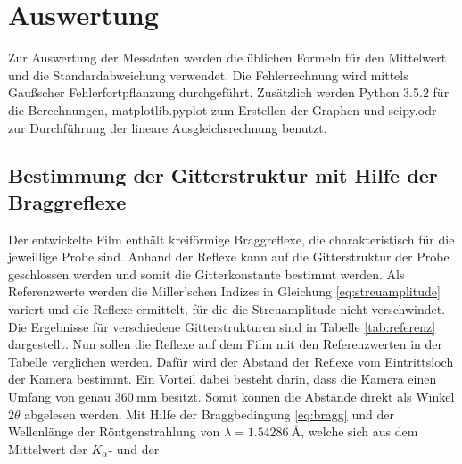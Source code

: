 \section{Auswertung}

Zur Auswertung der Messdaten werden die üblichen Formeln für den Mittelwert und die Standardabweichung verwendet. Die Fehlerrechnung wird mittels
Gaußscher Fehlerfortpflanzung durchgeführt. Zusätzlich werden Python 3.5.2 für die Berechnungen, matplotlib.pyplot zum Erstellen der Graphen und
scipy.odr zur Durchführung der lineare Ausgleichsrechnung benutzt.

\subsection{Bestimmung der Gitterstruktur mit Hilfe der Braggreflexe}



Der entwickelte Film enthält kreiförmige Braggreflexe, die charakteristisch für die jeweillige Probe sind. Anhand der Reflexe kann auf die Gitterstruktur der
Probe geschlossen werden und somit die Gitterkonstante bestimmt werden.
Als Referenzwerte werden die Miller'schen Indizes in Gleichung \eqref{eq:streuamplitude} variert und die Reflexe ermittelt, für die die Streuamplitude nicht verschwindet.
Die Ergebnisse für
verschiedene Gitterstrukturen sind in Tabelle \ref{tab:referenz} dargestellt.\newline
Nun sollen die Reflexe auf dem Film mit den Referenzwerten in der Tabelle verglichen werden. Dafür wird der Abstand der Reflexe vom Eintrittsloch der Kamera bestimmt. Ein
Vorteil dabei besteht darin, dass die Kamera einen Umfang von genau $\SI{360}{\milli\meter}$ besitzt. Somit können die Abstände direkt als Winkel
$2\theta$ abgelesen werden. Mit Hilfe der Braggbedingung \eqref{eq:bragg} und der Wellenlänge der Röntgenstrahlung von
$\lambda = \SI{1,54286}{\angstrom}$, welche sich aus dem Mittelwert der $K_\alpha$- und der

